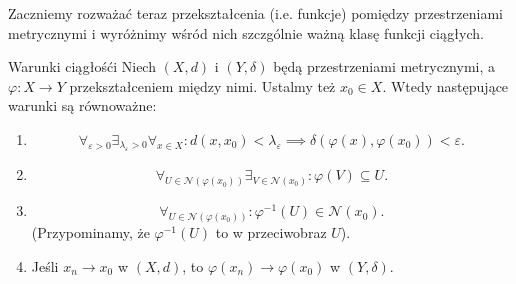\documentclass{article}
\numberwithin{defi}{section}
\numberwithin{defi}{section}
\newcommand{\Nau}{\mathcal{N}}
\providecommand{\eps}{\varepsilon}
\begin{document}
Zaczniemy rozważać teraz przekształcenia (i.e. funkcje) pomiędzy przestrzeniami metrycznymi i wyróżnimy wśród nich szczgólnie ważną klasę funkcji ciągłych.

\begin{twier}{Warunki ciągłośći} \label{twier:warunki-ciaglosci}
    Niech $(X, d)$ i $(Y, \delta)$ będą przestrzeniami metrycznymi, a $\varphi : X \to Y$ przekształceniem między nimi. Ustalmy też $x_0 \in X$. Wtedy następujące warunki są równoważne:
    \begin{enumerate}
        \item \begin{equation}
                  \forall_{\eps > 0} \exists_{\lambda_\eps >0} \forall_{x \in X}: d(x, x_0) < \lambda_\eps \implies \delta(\varphi(x), \varphi(x_0)) < \eps.
              \end{equation}
        \item \begin{equation}
                  \forall_{U \in \Nau(\varphi(x_0))} \exists_{V \in \Nau(x_0)}: \varphi(V) \subseteq U.
              \end{equation}
        \item \begin{equation}
                  \forall_{U \in \Nau(\varphi(x_0))}: \varphi^{-1}(U) \in \Nau(x_0).
              \end{equation} (Przypominamy, że $\varphi^{-1}(U)$ to w przeciwobraz $U$).
        \item Jeśli $x_n \to x_0$ w $(X, d)$, to $\varphi(x_n) \to \varphi(x_0)$ w $(Y, \delta)$.
    \end{enumerate}
\end{twier}
\end{document}
